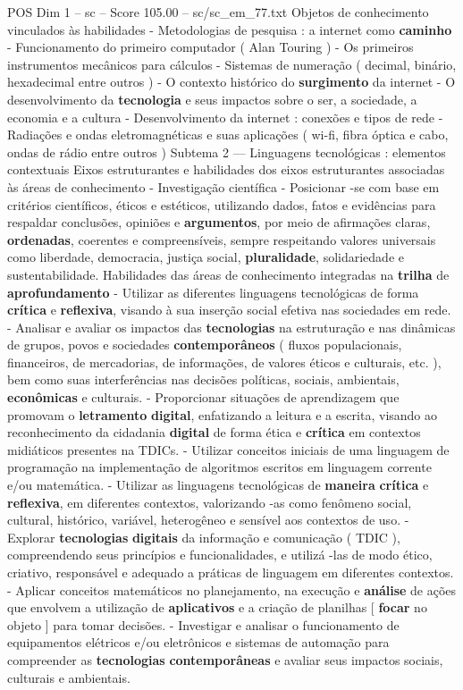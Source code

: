 \begin{textsample}{POS Dim 1 – sc – Score 105.00 – sc/sc\_em\_77.txt}
Objetos de conhecimento vinculados às habilidades - Metodologias de pesquisa : a internet como \textbf{caminho} - Funcionamento do primeiro computador ( Alan Touring ) - Os primeiros instrumentos mecânicos para cálculos - Sistemas de numeração ( decimal, binário, hexadecimal entre outros ) - O contexto histórico do \textbf{surgimento} da internet - O desenvolvimento da \textbf{tecnologia} e seus impactos sobre o ser, a sociedade, a economia e a cultura - Desenvolvimento da internet : conexões e tipos de rede - Radiações e ondas eletromagnéticas e suas aplicações ( wi-fi, fibra óptica e cabo, ondas de rádio entre outros ) Subtema 2 — Linguagens tecnológicas : elementos contextuais Eixos estruturantes e habilidades dos eixos estruturantes associadas às áreas de conhecimento - Investigação científica - Posicionar -se com base em critérios científicos, éticos e estéticos, utilizando dados, fatos e evidências para respaldar conclusões, opiniões e \textbf{argumentos}, por meio de afirmações claras, \textbf{ordenadas}, coerentes e compreensíveis, sempre respeitando valores universais como liberdade, democracia, justiça social, \textbf{pluralidade}, solidariedade e sustentabilidade.
Habilidades das áreas de conhecimento integradas na \textbf{trilha} de \textbf{aprofundamento} - Utilizar as diferentes linguagens tecnológicas de forma \textbf{crítica} e \textbf{reflexiva}, visando à sua inserção social efetiva nas sociedades em rede. - Analisar e avaliar os impactos das \textbf{tecnologias} na estruturação e nas dinâmicas de grupos, povos e sociedades \textbf{contemporâneos} ( fluxos populacionais, financeiros, de mercadorias, de informações, de valores éticos e culturais, etc. ), bem como suas interferências nas decisões políticas, sociais, ambientais, \textbf{econômicas} e culturais. - Proporcionar situações de aprendizagem que promovam o \textbf{letramento} \textbf{digital}, enfatizando a leitura e a escrita, visando ao reconhecimento da cidadania \textbf{digital} de forma ética e \textbf{crítica} em contextos midiáticos presentes na TDICs. - Utilizar conceitos iniciais de uma linguagem de programação na implementação de algoritmos escritos em linguagem corrente e/ou matemática. - Utilizar as linguagens tecnológicas de \textbf{maneira} \textbf{crítica} e \textbf{reflexiva}, em diferentes contextos, valorizando -as como fenômeno social, cultural, histórico, variável, heterogêneo e sensível aos contextos de uso. - Explorar \textbf{tecnologias} \textbf{digitais} da informação e comunicação ( TDIC ), compreendendo seus princípios e funcionalidades, e utilizá -las de modo ético, criativo, responsável e adequado a práticas de linguagem em diferentes contextos. - Aplicar conceitos matemáticos no planejamento, na execução e \textbf{análise} de ações que envolvem a utilização de \textbf{aplicativos} e a criação de planilhas [ \textbf{focar} no objeto ] para tomar decisões. - Investigar e analisar o funcionamento de equipamentos elétricos e/ou eletrônicos e sistemas de automação para compreender as \textbf{tecnologias} \textbf{contemporâneas} e avaliar seus impactos sociais, culturais e ambientais.

\end{textsample}
